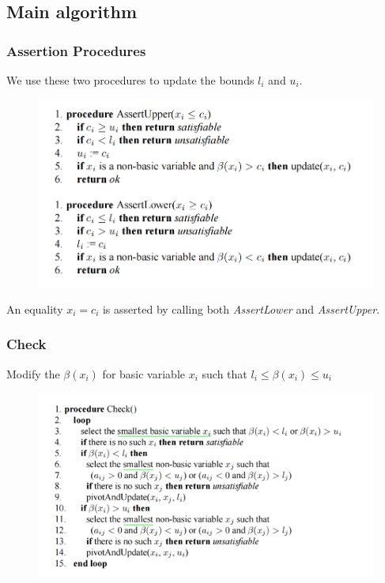 \documentclass[aspectratio=169%
,serif,mathserif]{beamer}
\begin{document}
\subsection{Main algorithm}
\begin{frame}
	\frametitle{Assertion Procedures}
	We use these two procedures to update the bounds $l_i$ and $u_i$.
	\begin{figure}[htbp]
		\includegraphics[width=.6\linewidth]{2.png}
	\end{figure}
	An equality $x_i = c_i$ is asserted by calling both \emph{AssertLower} and \emph{AssertUpper}.
\end{frame}

\begin{frame}
	\frametitle{Check}
	Modify the $\beta(x_i)$ for basic variable $x_i$ such that $l_{i} \leq \beta\left(x_{i}\right) \leq u_{i}$
	\begin{figure}[htbp]
		\includegraphics[width=.7\linewidth]{3.png}
	\end{figure}

\end{frame}
\end{document}
